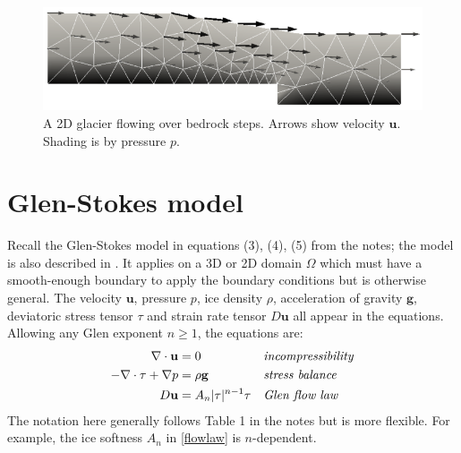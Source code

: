 \documentclass[letterpaper,final,12pt,reqno]{amsart}
\newcommand{\bg}{\mathbf{g}}
\newcommand{\bu}{\mathbf{u}}
\begin{document}
\begin{figure}[h]
\includegraphics[width=\textwidth,angle=-5.7296]{stepflowlin}  %
\caption{A 2D glacier flowing over bedrock steps.  Arrows show velocity $\bu$.  Shading is by pressure $p$.}
\label{fig:glacier}
\end{figure}


\section{Glen-Stokes model} \label{sec:stokes}

Recall the Glen-Stokes model in equations (3), (4), (5) from the notes; the model is also described in \cite{GreveBlatter2009,JouvetRappaz2011}.  It applies on a 3D or 2D domain $\Omega$ which must have a smooth-enough boundary to apply the boundary conditions but is otherwise general.  The velocity $\bu$, pressure $p$, ice density $\rho$, acceleration of gravity $\bg$, deviatoric stress tensor $\tau$ and strain rate tensor $D\bu$ all appear in the equations.  Allowing any Glen exponent $n\ge 1$, the equations are:
\begin{align}
\nabla \cdot \bu &= 0 &&\text{\emph{incompressibility}} \label{incompressible} \\
- \nabla \cdot \tau + \nabla p &= \rho \bg &&\text{\emph{stress balance}} \label{forcebalance} \\
D\bu &= A_n |\tau|^{n-1} \tau &&\text{\emph{Glen flow law}} \label{flowlaw}
\end{align}
The notation here generally follows Table 1 in the notes but is more flexible.  For example, the ice softness $A_n$ in \eqref{flowlaw} is $n$-dependent.
\end{document}
